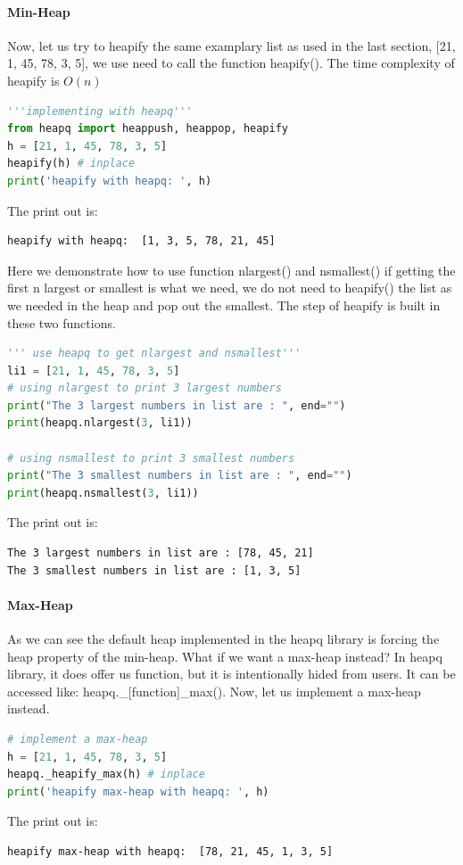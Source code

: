 \documentclass[main.tex]{subfiles}
\begin{document}
\paragraph{Min-Heap} Now, let us try to heapify the same examplary list as used in the last section, [21, 1, 45, 78, 3, 5], we use need to call the function heapify(). The time complexity of heapify is $O(n)$
\begin{lstlisting}[language = Python]
'''implementing with heapq'''
from heapq import heappush, heappop, heapify
h = [21, 1, 45, 78, 3, 5]
heapify(h) # inplace
print('heapify with heapq: ', h)
\end{lstlisting}
The print out is:
\begin{lstlisting}
heapify with heapq:  [1, 3, 5, 78, 21, 45]
\end{lstlisting}

 Here we demonstrate how to use function nlargest() and nsmallest() if getting the first n largest or smallest is what we need, we do not need to heapify() the list as we needed in the heap and pop out the smallest. The step of heapify is built in these two functions.
\begin{lstlisting}[language=Python]
''' use heapq to get nlargest and nsmallest'''
li1 = [21, 1, 45, 78, 3, 5]
# using nlargest to print 3 largest numbers
print("The 3 largest numbers in list are : ", end="")
print(heapq.nlargest(3, li1))

# using nsmallest to print 3 smallest numbers
print("The 3 smallest numbers in list are : ", end="")
print(heapq.nsmallest(3, li1))
\end{lstlisting}
The print out is:
\begin{lstlisting}
The 3 largest numbers in list are : [78, 45, 21]
The 3 smallest numbers in list are : [1, 3, 5]
\end{lstlisting}


\paragraph{Max-Heap} As we can see the default heap implemented in the heapq library is forcing the heap property of the min-heap. What if we want a max-heap instead? In heapq library, it does offer us function, but it is intentionally hided from users. It can be accessed like: heapq.\_[function]\_max(). Now, let us implement a max-heap instead. 
\begin{lstlisting}[language = Python]
# implement a max-heap
h = [21, 1, 45, 78, 3, 5]
heapq._heapify_max(h) # inplace
print('heapify max-heap with heapq: ', h)
\end{lstlisting}
The print out is:
\begin{lstlisting}
heapify max-heap with heapq:  [78, 21, 45, 1, 3, 5]
\end{lstlisting}
\end{document}
